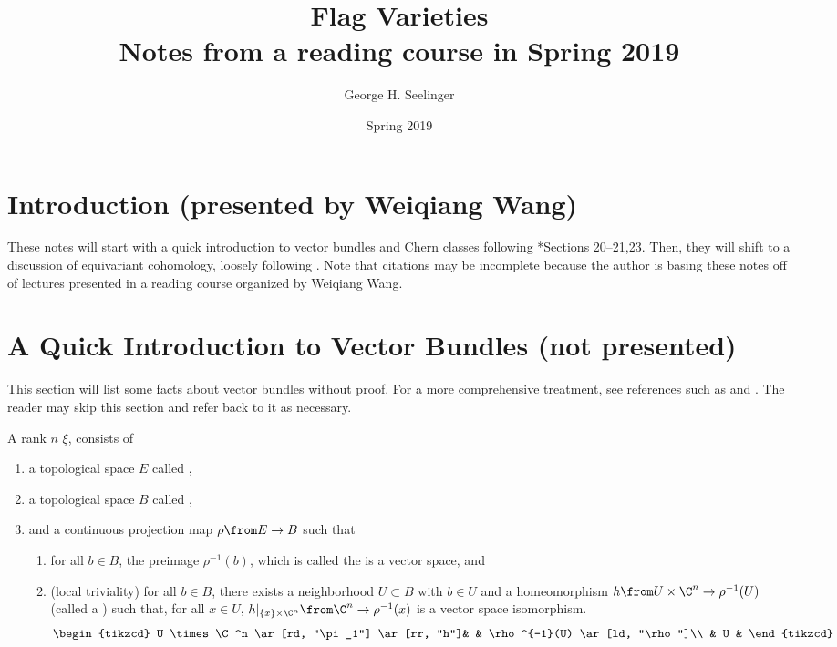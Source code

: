 \documentclass[11pt,leqno,oneside]{amsbook}
\title[Flag Varieties]{Flag Varieties \\ Notes
  from a reading course in Spring 2019}
\author{George H. Seelinger}
\date{Spring 2019}
\numberwithin{thm}{section}
\begin{document}
\maketitle

\section{Introduction (presented by Weiqiang Wang)}
These notes will start with a quick introduction to vector bundles and
Chern classes following \cite{bott-tu}*{Sections 20--21,23}. Then,
they will shift to a discussion of equivariant cohomology, loosely
following \cite{fulton}. Note that citations may be incomplete because
the author is basing these notes off of lectures presented in a
reading course organized by Weiqiang Wang. 
\section{A Quick Introduction to Vector Bundles (not presented)}
This section will list some facts about vector bundles without
proof. For a more comprehensive treatment, see references such as
\cite{bott-tu} and \cite{milnor-stasheff}. The reader may skip this
section and refer back to it as necessary. 
\begin{defn}\label{defn-of-vector-bundle}
  A rank \(n\)  \(\xi\), consists of
  \begin{enumerate}
  \item a topological space \(E\) called ,
  \item a topological space \(B\) called ,
  \item and a continuous projection map \(\rho \from E \to B\) such that
    \begin{enumerate}[label=(\roman*)]
    \item for all \(b \in B\), the preimage \(\rho^{-1}(b)\), which is
      called the  is a vector space, and
    \item (local triviality) for all \(b \in B\), there exists a neighborhood \(U \subset
      B\) with \(b \in U\) and a homeomorphism \(h \from U \times \C^n
      \to \rho^{-1}(U)\) (called a ) such
      that, for all \(x \in U\), \(h|_{\{x\} 
        \times \C^n} \from \C^n \to \rho^{-1}(x)\) is a vector space
      isomorphism. \[
        \begin{tikzcd}
          U \times \C^n \ar[rd, "\pi_1"] \ar[rr, "h"]& & \rho^{-1}(U)
          \ar[ld, "\rho"]\\
          & U &
        \end{tikzcd}
      \]
    \end{enumerate}
  \end{enumerate}
\end{defn}
\end{document}

